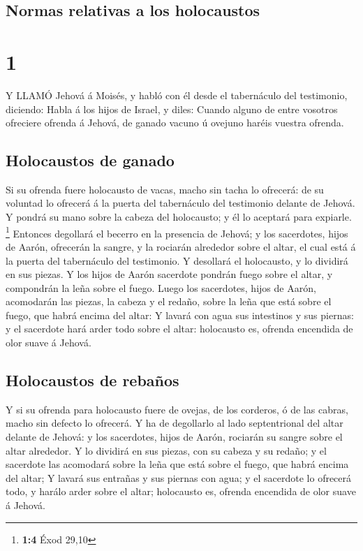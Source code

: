 \hypertarget{normas-relativas-a-los-holocaustos}{%
\subsection{Normas relativas a los
holocaustos}\label{normas-relativas-a-los-holocaustos}}

\hypertarget{section}{%
\section{1}\label{section}}

 Y LLAMÓ Jehová á Moisés, y habló con él desde el
tabernáculo del testimonio, diciendo:  Habla á los hijos de
Israel, y diles: Cuando alguno de entre vosotros ofreciere ofrenda á
Jehová, de ganado vacuno ú ovejuno haréis vuestra ofrenda.

\hypertarget{holocaustos-de-ganado}{%
\subsection{Holocaustos de ganado}\label{holocaustos-de-ganado}}

 Si su ofrenda fuere holocausto de vacas, macho sin tacha lo
ofrecerá: de su voluntad lo ofrecerá á la puerta del tabernáculo del
testimonio delante de Jehová.  Y pondrá su mano sobre la
cabeza del holocausto; y él lo aceptará para expiarle. \footnote{\textbf{1:4}
  Éxod 29,10}  Entonces degollará el becerro en la presencia
de Jehová; y los sacerdotes, hijos de Aarón, ofrecerán la sangre, y la
rociarán alrededor sobre el altar, el cual está á la puerta del
tabernáculo del testimonio.  Y desollará el holocausto, y lo
dividirá en sus piezas.  Y los hijos de Aarón sacerdote
pondrán fuego sobre el altar, y compondrán la leña sobre el fuego.
 Luego los sacerdotes, hijos de Aarón, acomodarán las
piezas, la cabeza y el redaño, sobre la leña que está sobre el fuego,
que habrá encima del altar:  Y lavará con agua sus
intestinos y sus piernas: y el sacerdote hará arder todo sobre el altar:
holocausto es, ofrenda encendida de olor suave á Jehová.

\hypertarget{holocaustos-de-rebauxf1os}{%
\subsection{Holocaustos de rebaños}\label{holocaustos-de-rebauxf1os}}

 Y si su ofrenda para holocausto fuere de ovejas, de los
corderos, ó de las cabras, macho sin defecto lo ofrecerá. 
Y ha de degollarlo al lado septentrional del altar delante de Jehová: y
los sacerdotes, hijos de Aarón, rociarán su sangre sobre el altar
alrededor.  Y lo dividirá en sus piezas, con su cabeza y su
redaño; y el sacerdote las acomodará sobre la leña que está sobre el
fuego, que habrá encima del altar;  Y lavará sus entrañas y
sus piernas con agua; y el sacerdote lo ofrecerá todo, y harálo arder
sobre el altar; holocausto es, ofrenda encendida de olor suave á Jehová.

